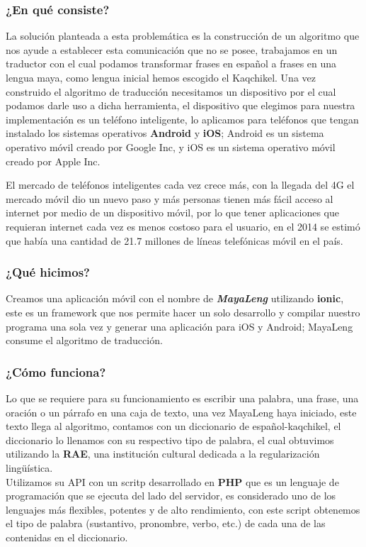 \documentclass[a4paper,openright,11pt]{article}
\begin{document}
\subsubsection{¿En qué consiste?}
La solución planteada a esta problemática es la construcción de un algoritmo que nos ayude a establecer esta comunicación que no se posee, trabajamos en un traductor con el cual podamos transformar frases en español a frases en una lengua maya, como lengua inicial hemos escogido el Kaqchikel. Una vez construido el algoritmo de traducción necesitamos un dispositivo por el cual podamos darle uso a dicha herramienta, el dispositivo que elegimos para nuestra implementación es un teléfono inteligente, lo aplicamos para teléfonos que tengan instalado los sistemas operativos \textbf{Android} y \textbf{iOS}; Android es un sistema operativo móvil creado por Google Inc, y iOS es un sistema operativo móvil creado por Apple Inc.

El mercado de teléfonos inteligentes cada vez crece más, con la llegada del 4G el mercado móvil dio un nuevo paso y más personas tienen más fácil acceso al internet por medio de un dispositivo móvil, por lo que tener aplicaciones que requieran internet cada vez es menos costoso para el usuario, en el 2014 se estimó que había una cantidad de 21.7 millones de líneas telefónicas móvil en el país.

\subsubsection{¿Qué hicimos?}
Creamos una aplicación móvil con el nombre de \textbf{\textit{MayaLeng}} utilizando \textbf{ionic}, este es un framework que nos permite hacer un solo desarrollo y compilar nuestro programa una sola vez y generar una aplicación para iOS y Android; MayaLeng consume el algoritmo de traducción.

\subsubsection{¿Cómo funciona?}
Lo que se requiere para su funcionamiento es escribir una palabra, una frase, una oración o un párrafo en una caja de texto, una vez MayaLeng haya iniciado, este texto llega al algoritmo, contamos con un diccionario de español-kaqchikel, el diccionario lo llenamos con su respectivo tipo de palabra, el cual obtuvimos utilizando la \textbf{RAE}, una institución cultural dedicada a la regularización lingüística.\\
Utilizamos su API con un scritp desarrollado en \textbf{PHP} que es un lenguaje de programación que se ejecuta del lado del servidor, es considerado uno de los lenguajes más flexibles, potentes y de alto rendimiento,  con este script obtenemos el tipo de palabra (sustantivo, pronombre, verbo, etc.) de cada una de las contenidas en el diccionario.\\\\
\end{document}
